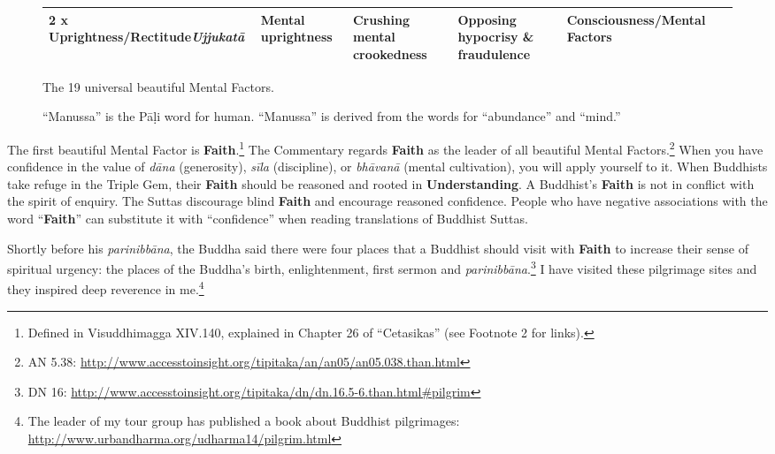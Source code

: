 \begin{figure} [H]
\begin{tabular}{P{0.25\textwidth} | C{.185\textwidth} C{0.185\textwidth} C{0.185\textwidth} C{0.195\textwidth} m{0mm}}
2 x \textbf{Uprightness}/\newline Rectitude\newline \textit{Ujjukatā} & Mental uprightness & Crushing mental crookedness & Opposing hypocrisy \& fraudulence & Consciousness/\newline Mental Factors &\\[12mm]
\bottomrule
\end{tabular} 

\caption{The 19 universal beautiful Mental Factors.}

\end{figure}

\pagebreak

\begin{figure}[H]
\centering

\caption{“Manussa” is the Pāḷi word for human. “Manussa” is derived from the words for “abundance” and “mind.”}
\label{fig:Key}
\end{figure}

The first beautiful Mental Factor is \textbf{Faith}.\footnote{Defined in Visuddhimagga XIV.140, explained in Chapter 26 of “Cetasikas” (see Footnote 2 for links).} The Commentary regards \textbf{Faith} as the leader of all beautiful Mental Factors.\footnote{AN 5.38: \url{http://www.accesstoinsight.org/tipitaka/an/an05/an05.038.than.html}} When you have confidence in the value of \textit{dāna} (generosity), \textit{sīla} (discipline), or \textit{bhāvanā} (mental cultivation), you will apply yourself to it. When Buddhists take refuge in the Triple Gem, their \textbf{Faith} should be reasoned and rooted in \textbf{Understanding}. A Buddhist’s \textbf{Faith} is not in conflict with the spirit of enquiry. The Suttas discourage blind \textbf{Faith} and encourage reasoned confidence. People who have negative associations with the word “\textbf{Faith}” can substitute it with “confidence” when reading translations of Buddhist Suttas.

Shortly before his \textit{parinibbāna}, the Buddha said there were four places that a Buddhist should visit with \textbf{Faith} to increase their sense of spiritual urgency: the places of the Buddha’s birth, enlightenment, first sermon and \textit{parinibbāna}.\footnote{DN 16: \url{http://www.accesstoinsight.org/tipitaka/dn/dn.16.5-6.than.html\#pilgrim}} I have visited these pilgrimage sites and they inspired deep reverence in me.\footnote{The leader of my tour group has published a book about Buddhist pilgrimages: \url{http://www.urbandharma.org/udharma14/pilgrim.html}}

